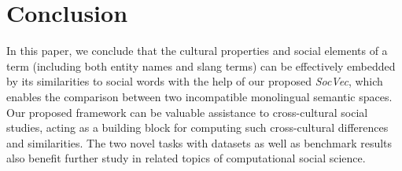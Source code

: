 \vspace{-10pt}
\section{Conclusion}
In this paper, we conclude that the cultural properties and social elements of a term (including both entity names and slang terms) can be effectively embedded by its similarities to social words with the help of our proposed 
\textit{SocVec}, which enables the comparison between two incompatible 
monolingual semantic spaces. 
Our proposed framework can be valuable assistance to cross-cultural 
social studies, acting as a building block for 
computing such cross-cultural differences and similarities. 
The two novel tasks with datasets as well as benchmark results also benefit 
further study in related topics of computational social science.
